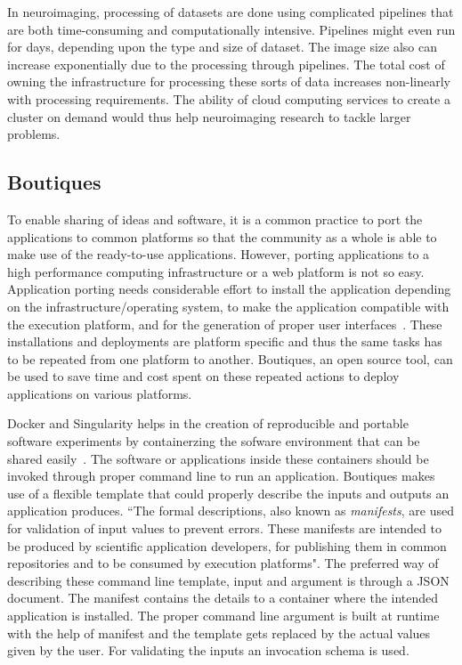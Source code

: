 In neuroimaging, processing of datasets are done using complicated pipelines that are both time-consuming and computationally intensive. Pipelines might even run for days, depending upon the type and size of dataset. The image size also can increase exponentially due to the processing through pipelines. The total cost of owning the infrastructure for processing these sorts of data increases non-linearly with processing requirements. The ability of cloud computing services to create a cluster on demand would thus help neuroimaging research to tackle larger problems.

\subsection{Boutiques}
To enable sharing of ideas and software, it is a common practice to port the applications to common platforms so that the community as a whole is able to make use of the ready-to-use applications. However, porting applications to a high performance computing infrastructure or a web platform is not so easy. Application porting needs considerable effort to install the application depending on the infrastructure/operating system, to make the application compatible with the execution platform, and for the generation of proper user interfaces~\cite{boutiques}. These installations and deployments are platform specific and thus the same tasks has to be repeated from one platform to another. Boutiques, an open source tool, can be used to save time and cost spent on these repeated actions to deploy applications on various platforms.

Docker and Singularity helps in the creation of reproducible and portable software experiments by containerzing the sofware environment that can be shared easily~\cite{boutiques}. The software or applications inside these containers should be invoked through proper command line to run an application. Boutiques makes use of a flexible template that could properly describe the inputs and outputs an application produces. ``The formal descriptions, also known as \textit{manifests}, are used for validation of input values to prevent errors. These manifests are intended to be produced by scientific application developers, for publishing them in common repositories and to be consumed by execution platforms". The preferred way of describing these command line template, input and argument is through a JSON document. The manifest contains the details to a container where the intended application is installed. The proper command line argument is built at runtime with the help of manifest and the template gets replaced by the actual values given by the user. For validating the inputs an invocation schema is used.

